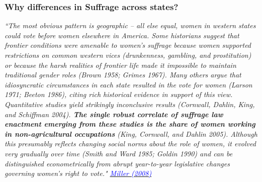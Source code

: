 \documentclass[10pt,letterpaper,subeqn]{beamer}
\begin{document}
\begin{frame}[label=WhySuffrage]
\frametitle{Why differences in Suffrage across states?}
\vspace{4mm}
\textit{``The most obvious pattern is geographic – all else equal, women in western states could vote before women elsewhere in America. Some historians suggest that frontier conditions were amenable to women's suffrage because women supported restrictions on common western vices (drunkenness, gambling, and prostitution) or because the harsh realities of frontier life made it impossible to maintain traditional gender roles (Brown 1958; Grimes 1967). Many others argue that idiosyncratic circumstances in each state resulted in the vote for women (Larson 1971; Beeton 1986), citing rich historical evidence in support of this view. Quantitative studies yield strikingly inconclusive results (Cornwall, Dahlin, King, and Schiffman 2004). \textbf{The single robust correlate of suffrage law enactment emerging from these studies is the share of women working in non-agricultural occupations} (King, Cornwall, and Dahlin 2005). Although this presumably reflects changing social norms about the role of women, it evolved very gradually over time (Smith and Ward 1985; Goldin 1990) and can be distinguished econometrically from abrupt year-to-year legislative changes governing women’s right to vote." \hyperlink{USAHistory}{\textcolor{blue}{Miller (2008)}}}\\
 \end{frame} 
\end{document}
